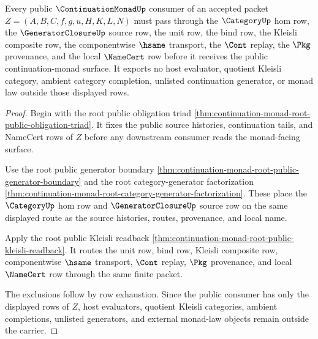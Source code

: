 \begin{theorem}
\label{thm:continuation-monad-root-public-consumer-totality}
Every public $\ContinuationMonadUp$ consumer of an accepted packet $Z=(A,B,C,f,g,u,H,K,L,N)$ must pass through the $\CategoryUp$ hom row, the $\GeneratorClosureUp$ source row, the unit row, the bind row, the Kleisli composite row, the componentwise $\hsame$ transport, the $\Cont$ replay, the $\Pkg$ provenance, and the local $\NameCert$ row before it receives the public continuation-monad surface. It exports no host evaluator, quotient Kleisli category, ambient category completion, unlisted continuation generator, or monad law outside those displayed rows.
\end{theorem}
\begin{proof}
Begin with the root public obligation triad \autoref{thm:continuation-monad-root-public-obligation-triad}. It fixes the public source histories, continuation tails, and NameCert rows of $Z$ before any downstream consumer reads the monad-facing surface.

Use the root public generator boundary \autoref{thm:continuation-monad-root-public-generator-boundary} and the root category-generator factorization \autoref{thm:continuation-monad-root-category-generator-factorization}. These place the $\CategoryUp$ hom row and $\GeneratorClosureUp$ source row on the same displayed route as the source histories, routes, provenance, and local name.

Apply the root public Kleisli readback \autoref{thm:continuation-monad-root-public-kleisli-readback}. It routes the unit row, bind row, Kleisli composite row, componentwise $\hsame$ transport, $\Cont$ replay, $\Pkg$ provenance, and local $\NameCert$ row through the same finite packet.

The exclusions follow by row exhaustion. Since the public consumer has only the displayed rows of $Z$, host evaluators, quotient Kleisli categories, ambient completions, unlisted generators, and external monad-law objects remain outside the carrier.
\end{proof}

